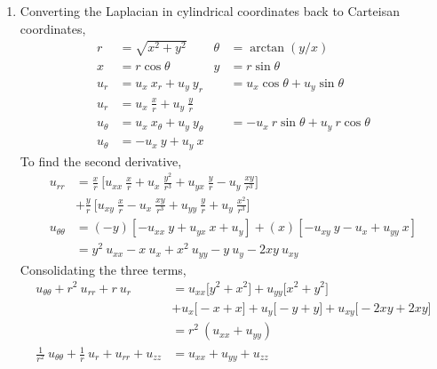 \begin{enumerate}
    \item Converting the Laplacian in cylindrical coordinates back to Carteisan
          coordinates,
          \begin{align}
              r        & = \sqrt{x^2 + y^2}                     &
              \theta   & = \arctan(y/x)                           \\
              x        & = r\cos\theta                          &
              y        & = r\sin\theta                            \\
              u_r      & = u_x\ x_r + u_y\ y_r                  &
                       & = u_x \cos\theta + u_y \sin\theta        \\
              u_{r}    & = u_x\ \frac{x}{r} + u_y\ \frac{y}{r}    \\
              u_\theta & = u_x\ x_\theta + u_y\ y_\theta        &
                       & = -u_x\ r\sin\theta + u_y\ r\cos\theta   \\
              u_\theta & = -u_x\ y + u_y\ x
          \end{align}
          To find the second derivative,
          \begin{align}
              u_{rr}           & = \frac{x}{r}\ \Bigg[u_{xx}\ \frac{x}{r}
                  + u_x\ \frac{y^2}{r^3} + u_{yx}\ \frac{y}{r}
              - u_y\ \frac{xy}{r^3}\Bigg]                                      \\
                               & +  \frac{y}{r}\ \Bigg[u_{xy}\ \frac{x}{r}
                  - u_x\ \frac{xy}{r^3} + u_{yy}\ \frac{y}{r}
              + u_y\ \frac{x^2}{r^3}\Bigg]                                     \\
              u_{\theta\theta} & = (-y)[-u_{xx}\ y + u_{yx}\ x + u_y]
              + (x) [-u_{xy}\ y - u_x + u_{yy}\ x]                             \\
                               & = y^2\ u_{xx} - x\ u_x + x^2\ u_{yy} - y\ u_y
              -2xy\ u_{xy}
          \end{align}
          Consolidating the three terms,
          \begin{align}
              u_{\theta\theta} + r^2\ u_{rr} + r\ u_r & = u_{xx} \Big[ y^2
              + x^2 \Big] + u_{yy} \Big[ x^2 + y^2 \Big]                         \\
                                                      & + u_x \Big[
                  -x + x \Big] + u_y \Big[ -y + y \Big] + u_{xy} \Big[
              -2xy + 2xy\Big]                                                    \\
                                                      & = r^2\ (u_{xx} + u_{yy}) \\
              \frac{1}{r^2}\ u_{\theta\theta} +
              \frac{1}{r}\ u_r + u_{rr} + u_{zz}      &
              = u_{xx} + u_{yy} + u_{zz}
          \end{align}


\end{enumerate}
